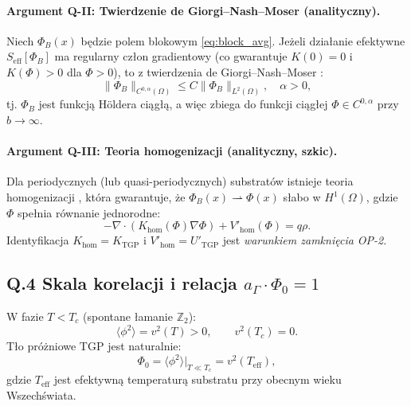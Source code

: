 \paragraph{Argument Q-II: Twierdzenie de Giorgi–Nash–Moser (analityczny).}
Niech $\Phi_B(x)$ będzie polem blokowym \eqref{eq:block_avg}.
Jeżeli działanie efektywne $S_\mathrm{eff}[\Phi_B]$ ma regularny
człon gradientowy (co gwarantuje $K(0) = 0$ i $K(\Phi) > 0$ dla $\Phi > 0$),
to z twierdzenia de Giorgi–Nash–Moser \cite{DeGiorgi1957}:
\begin{equation}
  \|\Phi_B\|_{C^{0,\alpha}(\Omega)} \leq C \|\Phi_B\|_{L^2(\Omega)},
  \quad \alpha > 0,
\end{equation}
tj. $\Phi_B$ jest funkcją Höldera ciągłą, a więc zbiega do funkcji ciągłej
$\Phi \in C^{0,\alpha}$ przy $b \to \infty$.

\paragraph{Argument Q-III: Teoria homogenizacji (analityczny, szkic).}
Dla periodycznych (lub quasi-periodycznych) substratów istnieje teoria
homogenizacji \cite{Bensoussan1978}, która gwarantuje, że
$\Phi_B(x) \rightharpoonup \Phi(x)$ słabo w $H^1(\Omega)$,
gdzie $\Phi$ spełnia równanie jednorodne:
\begin{equation}
  -\nabla \cdot (K_\mathrm{hom}(\Phi)\nabla\Phi) + V'_\mathrm{hom}(\Phi) = q\rho.
\end{equation}
Identyfikacja $K_\mathrm{hom} = K_\mathrm{TGP}$ i $V'_\mathrm{hom} = U'_\mathrm{TGP}$
jest \emph{warunkiem zamknięcia OP-2}.

\subsection*{Q.4 Skala korelacji i relacja $a_\Gamma \cdot \Phi_0 = 1$}

\begin{propozycja}
\label{prop:phi0_from_Tc}
W fazie $T < T_c$ (spontane łamanie $\mathbb{Z}_2$):
\begin{equation}
  \langle\phi^2\rangle = v^2(T) > 0,
  \qquad v^2(T_c) = 0.
\end{equation}
Tło próżniowe TGP jest naturalnie:
\begin{equation}
  \boxed{\Phi_0 = \langle\phi^2\rangle\big|_{T \ll T_c} = v^2(T_\mathrm{eff})},
  \label{eq:phi0_from_TC}
\end{equation}
gdzie $T_\mathrm{eff}$ jest efektywną temperaturą substratu przy
obecnym wieku Wszechświata.
\end{propozycja}

